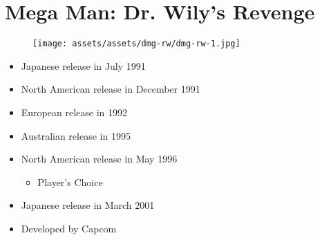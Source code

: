 \documentclass{book}
\begin{document}
\begingroup \chapter*{Mega Man: Dr. Wily’s Revenge} \endgroup
\begin{figure}[H]
\vskip 4pt
\centering
\texttt{[image: assets/assets/dmg-rw/dmg-rw-1.jpg]}\end{figure}
\begin{itemize} [nosep]




\item Japanese release in July 1991







\item North American release in December 1991







\item European release in 1992







\item Australian release in 1995







\item North American release in May 1996
\begin{itemize} [nosep]\item Player’s Choice\end{itemize}\noindent






\item Japanese release in March 2001
































\item Developed by Capcom

\end{itemize}\noindent
\end{document}
